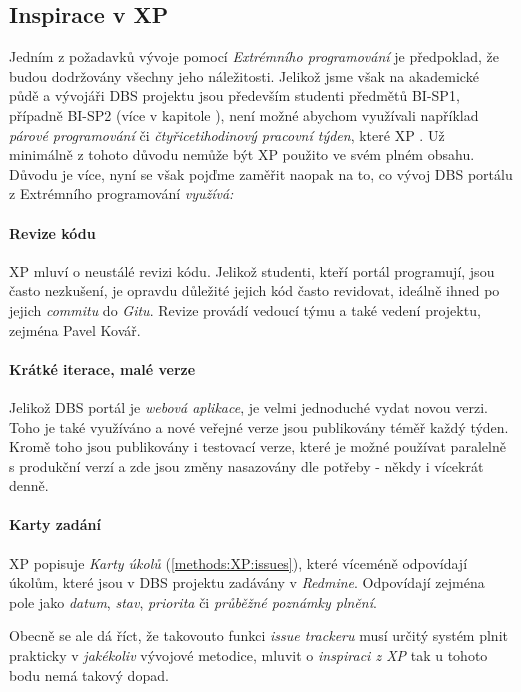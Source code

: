 \subsection{Inspirace v XP}

Jedním z požadavků vývoje pomocí \emph{Extrémního programování} je předpoklad, že budou dodržovány všechny jeho náležitosti. Jelikož jsme však na akademické půdě a vývojáři DBS projektu jsou především studenti předmětů BI-SP1, případně BI-SP2 (více v kapitole ), není možné abychom využívali například \emph{párové programování} či \emph{čtyřicetihodinový pracovní týden}, které XP .
Už minimálně z tohoto důvodu nemůže být XP použito ve svém plném obsahu. Důvodu je více, nyní se však pojďme zaměřit naopak na to, co vývoj DBS portálu z Extrémního programování \emph{využívá:}

\paragraph{Revize kódu}
XP mluví o neustálé revizi kódu. Jelikož studenti, kteří portál programují, jsou často nezkušení, je opravdu důležité jejich kód často revidovat, ideálně ihned po jejich \emph{commitu} do \emph{Gitu}. Revize provádí vedoucí týmu a také vedení projektu, zejména Pavel Kovář.

\paragraph{Krátké iterace, malé verze}
Jelikož DBS portál je \emph{webová aplikace}, je velmi jednoduché vydat novou verzi. Toho je také využíváno a nové veřejné verze jsou publikovány téměř každý týden. Kromě toho jsou publikovány i testovací verze, které je možné používat paralelně s produkční verzí a zde jsou změny nasazovány dle potřeby - někdy i vícekrát denně.

\paragraph{Karty zadání}
XP popisuje \emph{Karty úkolů} (\ref{methods:XP:issues}), které víceméně odpovídají úkolům, které jsou v DBS projektu zadávány v \emph{Redmine}. Odpovídají zejména pole jako \emph{datum}, \emph{stav}, \emph{priorita} či \emph{průběžné poznámky plnění}.

Obecně se ale dá říct, že takovouto funkci \emph{issue trackeru} musí určitý systém plnit prakticky v \emph{jakékoliv} vývojové metodice, mluvit o \emph{inspiraci z XP} tak u tohoto bodu nemá takový dopad.

